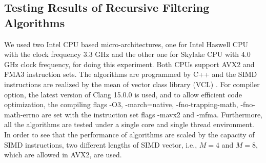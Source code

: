 \subsection{Testing Results of Recursive Filtering Algorithms}

We used two Intel CPU based micro-architectures, one for Intel Haswell CPU with the clock frequency 3.3 GHz
and the other one for Skylake CPU with 4.0 GHz clock frequency, for doing this experiment.
Both CPUs support AVX2 and FMA3 instruction sets. 
The algorithms are programmed by C++ and the SIMD instructions are realized
by the mean of vector class library (VCL) \cite{Agner_04}.
For compiler option, the latest version of Clang 15.0.0
is used, and to allow efficient code optimization, 
the compiling flags -O3, -march=native, -fno-trapping-math, -fno-math-errno are set with the instruction set flags -mavx2 and -mfma. 
Furthermore, all the algorithms are tested under a single core and single thread environment.
In order to see that the performance of algorithms are scaled by the capacity of SIMD instructions, two 
different lengths of SIMD vector, i.e., $M=4$ and $M=8$, which are allowed in AVX2, are used. 

